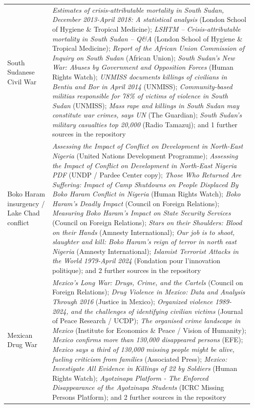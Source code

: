 \documentclass[11pt]{article}
\begin{document}
\begin{scriptsize}
\begin{longtable}{p{3.5cm} p{12.5cm}}
South Sudanese Civil War & \emph{Estimates of crisis-attributable mortality in South Sudan, December 2013-April 2018: A statistical analysis} (London School of Hygiene \& Tropical Medicine); \emph{LSHTM – Crisis-attributable mortality in South Sudan – Q\&A} (London School of Hygiene \& Tropical Medicine); \emph{Report of the African Union Commission of Inquiry on South Sudan} (African Union); \emph{South Sudan's New War: Abuses by Government and Opposition Forces} (Human Rights Watch); \emph{UNMISS documents killings of civilians in Bentiu and Bor in April 2014} (UNMISS); \emph{Community-based militias responsible for 78\% of victims of violence in South Sudan} (UNMISS); \emph{Mass rape and killings in South Sudan may constitute war crimes, says UN} (The Guardian); \emph{South Sudan's military casualties top 20,000} (Radio Tamazuj); and 1 further sources in the repository \\
\addlinespace
Boko Haram insurgency / Lake Chad conflict & \emph{Assessing the Impact of Conflict on Development in North-East Nigeria} (United Nations Development Programme); \emph{Assessing the Impact of Conflict on Development in North-East Nigeria PDF} (UNDP / Pardee Center copy); \emph{Those Who Returned Are Suffering: Impact of Camp Shutdowns on People Displaced By Boko Haram Conflict in Nigeria} (Human Rights Watch); \emph{Boko Haram’s Deadly Impact} (Council on Foreign Relations); \emph{Measuring Boko Haram’s Impact on State Security Services} (Council on Foreign Relations); \emph{Stars on their Shoulders: Blood on their Hands} (Amnesty International); \emph{Our job is to shoot, slaughter and kill: Boko Haram's reign of terror in north east Nigeria} (Amnesty International); \emph{Islamist Terrorist Attacks in the World 1979-April 2024} (Fondation pour l’innovation politique); and 2 further sources in the repository \\
\addlinespace
Mexican Drug War & \emph{Mexico's Long War: Drugs, Crime, and the Cartels} (Council on Foreign Relations); \emph{Drug Violence in Mexico: Data and Analysis Through 2016} (Justice in Mexico); \emph{Organized violence 1989-2024, and the challenges of identifying civilian victims} (Journal of Peace Research / UCDP); \emph{The organised crime landscape in Mexico} (Institute for Economics \& Peace / Vision of Humanity); \emph{Mexico confirms more than 130,000 disappeared persons} (EFE); \emph{Mexico says a third of 130,000 missing people might be alive, fueling criticism from families} (Associated Press); \emph{Mexico: Investigate All Evidence in Killings of 22 by Soldiers} (Human Rights Watch); \emph{Ayotzinapa Platform - The Enforced Disappearance of the Ayotzinapa Students} (ICRC Missing Persons Platform); and 2 further sources in the repository \\

\end{longtable}
\end{scriptsize}
\end{document}
